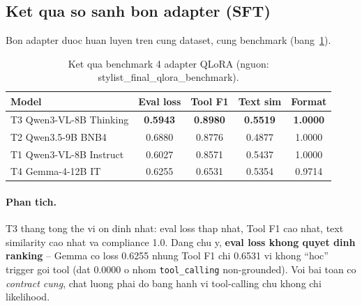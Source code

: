 \documentclass[12pt,a4paper]{article}
\begin{document}
\subsection{Ket qua so sanh bon adapter (SFT)}
Bon adapter duoc huan luyen tren cung dataset, cung benchmark (bang~\ref{tab:bench}).
\begin{table}[H]
  \centering
  \caption{Ket qua benchmark 4 adapter QLoRA (nguon: stylist\_final\_qlora\_benchmark).}
  \label{tab:bench}
  \begin{tabular}{lcccc}
    \toprule
    \textbf{Model} & Eval loss & Tool F1 & Text sim & Format \\
    \midrule
    T3 Qwen3-VL-8B Thinking & \textbf{0.5943} & \textbf{0.8980} & \textbf{0.5519} & \textbf{1.0000} \\
    T2 Qwen3.5-9B BNB4 & 0.6880 & 0.8776 & 0.4877 & 1.0000 \\
    T1 Qwen3-VL-8B Instruct & 0.6027 & 0.8571 & 0.5437 & 1.0000 \\
    T4 Gemma-4-12B IT & 0.6255 & 0.6531 & 0.5354 & 0.9714 \\
    \bottomrule
  \end{tabular}
\end{table}
\paragraph{Phan tich.} T3 thang tong the vi on dinh nhat: eval loss thap nhat, Tool F1 cao
nhat, text similarity cao nhat va compliance 1.0. Dang chu y, \textbf{eval loss khong quyet
dinh ranking} -- Gemma co loss 0.6255 nhung Tool F1 chi 0.6531 vi khong ``hoc'' trigger goi
tool (dat 0.0000 o nhom \texttt{tool\_calling} non-grounded). Voi bai toan co \emph{contract
cung}, chat luong phai do bang hanh vi tool-calling chu khong chi likelihood.
\end{document}
